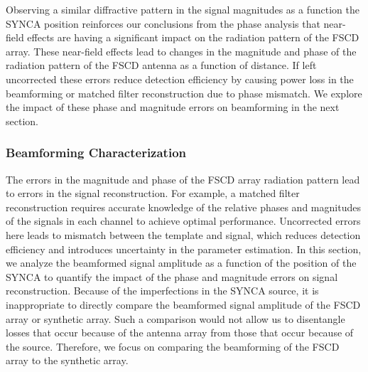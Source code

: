 Observing a similar diffractive pattern in the signal magnitudes as a function the SYNCA position reinforces our conclusions from the phase analysis that near-field effects are having a significant impact on the radiation pattern of the FSCD array. These near-field effects lead to changes in the magnitude and phase of the radiation pattern of the FSCD antenna as a function of distance. If left uncorrected these errors reduce detection efficiency by causing power loss in the beamforming or matched filter reconstruction due to phase mismatch. We explore the impact of these phase and magnitude errors on beamforming in the next section.

\subsubsection{Beamforming Characterization}
\label{sec:jugaad_bf_analysis}

The errors in the magnitude and phase of the FSCD array radiation pattern lead to errors in the signal reconstruction. For example, a matched filter reconstruction requires accurate knowledge of the relative phases and magnitudes of the signals in each channel to achieve optimal performance. Uncorrected errors here leads to mismatch between the template and signal, which reduces detection efficiency and introduces uncertainty in the parameter estimation. In this section, we analyze the beamformed signal amplitude as a function of the position of the SYNCA to quantify the impact of the phase and magnitude errors on signal reconstruction. Because of the imperfections in the SYNCA source, it is inappropriate to directly compare the beamformed signal amplitude of the FSCD array or synthetic array. Such a comparison would not allow us to disentangle losses that occur because of the antenna array from those that occur because of the source. Therefore, we focus on comparing the beamforming of the FSCD array to the synthetic array.

